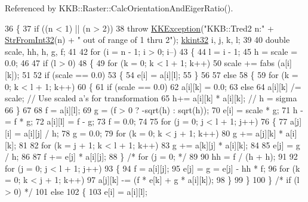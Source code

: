 Referenced by K\+K\+B\+::\+Raster\+::\+Calc\+Orientation\+And\+Eiger\+Ratio().


\begin{DoxyCode}
36 \{
37   \textcolor{keywordflow}{if} ((n < 1) || (n > 2))
38     \textcolor{keywordflow}{throw} \hyperlink{class_k_k_b_1_1_k_k_exception}{KKException}(\textcolor{stringliteral}{"KKB::Tred2  n:"} + \hyperlink{namespace_k_k_b_a66adf53f607bda7ab0d3e1c3945e792e}{StrFromInt32}(n) + \textcolor{stringliteral}{" out of range of 1 thru
       2"});  \hyperlink{namespace_k_k_b_a8fa4952cc84fda1de4bec1fbdd8d5b1b}{kkint32}  i, j, k, l;
39 
40   \textcolor{keywordtype}{double}  scale, hh, h, g, f;
41 
42   \textcolor{keywordflow}{for} (i = n - 1; i > 0;  i--)
43   \{
44     l = i - 1;
45     h = scale = 0.0;
46 
47     \textcolor{keywordflow}{if}  (l > 0)
48     \{
49       \textcolor{keywordflow}{for} (k = 0;  k < l + 1;  k++)
50         scale += fabs (a[i][k]);
51 
52       \textcolor{keywordflow}{if}  (scale == 0.0)
53       \{
54         e[i] = a[i][l];
55       \}
56 
57       \textcolor{keywordflow}{else}
58       \{
59         \textcolor{keywordflow}{for} (k = 0;  k < l + 1;  k++)
60         \{
61           \textcolor{keywordflow}{if}  (scale == 0.0)
62             a[i][k] = 0.0;
63           \textcolor{keywordflow}{else}
64             a[i][k] /= scale;     \textcolor{comment}{// Use scaled a's for transformation}
65           h+= a[i][k] * a[i][k];  \textcolor{comment}{// h = sigma}
66         \}
67         
68         f = a[i][l];
69         g = (f > 0 ? -sqrt(h) : sqrt(h));
70         e[i] = scale * g;
71         h -= f * g;
72         a[i][l] = f - g;
73         f = 0.0;
74 
75         \textcolor{keywordflow}{for}  (j = 0;  j < l + 1;  j++)
76         \{
77           a[j][i] = a[i][j] / h;
78           g = 0.0;
79           \textcolor{keywordflow}{for}  (k = 0;  k < j + 1;  k++)
80             g += a[j][k] * a[i][k];
81 
82           \textcolor{keywordflow}{for}  (k = j + 1;  k < l + 1;  k++)
83             g += a[k][j] * a[i][k];
84 
85           e[j] = g / h;
86 
87           f += e[j] * a[i][j];
88         \} \textcolor{comment}{/* for  (j = 0; */}
89 
90         hh = f / (h + h);
91 
92         \textcolor{keywordflow}{for}  (j = 0;  j < l + 1;  j++)
93         \{
94           f = a[i][j];
95           e[j] = g = e[j] - hh * f;
96           \textcolor{keywordflow}{for}  (k = 0;  k < j + 1;  k++)
97             a[j][k] -= (f * e[k] + g * a[i][k]);
98         \}
99       \}
100     \}  \textcolor{comment}{/* if  (l > 0) */}
101     \textcolor{keywordflow}{else}
102     \{
103       e[i] = a[i][l];

\end{DoxyCode}
